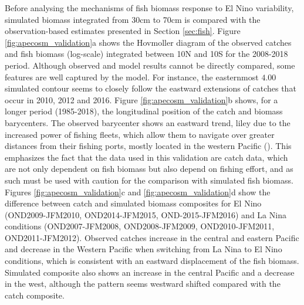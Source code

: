 Before analysing the mechanisms of fish biomass response to El Nino variability, simulated biomass integrated from 30cm to 70cm is compared with the observation-based estimates presented in Section \ref{sec:fish}. Figure \ref{fig:apecosm_validation}a shows the Hovmoller diagram of the observed catches and fish biomass (log-scale) integrated between 10N and 10S for the 2008-2018 period. Although observed and model results cannot be directly compared, some features are well captured by the model. For instance, the easternmost $4.00$ simulated contour seems to closely follow the eastward extensions of catches that occur in 2010, 2012 and 2016. Figure \ref{fig:apecosm_validation}b shows, for a longer period (1985-2018), the longitudinal position of the catch and biomass barycenters. The observed barycenter shows an eastward trend, liley due to the increased power of fishing fleets, which allow them to navigate over greater distances from their fishing ports, mostly located in the western Pacific (). This emphasizes the fact that the data used in this validation are catch data, which are not only dependent on fish biomass but also depend on fishing effort, and as such must be used with caution for the comparison with simulated fish biomass. Figures \ref{fig:apecosm_validation}c and \ref{fig:apecosm_validation}d show the difference between catch and simulated biomass composites for El Nino (OND2009-JFM2010, OND2014-JFM2015, OND-2015-JFM2016) and La Nina conditions (OND2007-JFM2008, OND2008-JFM2009, OND2010-JFM2011, OND2011-JFM2012). Observed catches increase in the central and eastern Pacific and decrease in the Western Pacific when switching from La Nina to El Nino conditions, which is consistent with an eastward displacement of the fish biomass. Simulated composite also shows an increase in the central Pacific and a decrease in the west, although the pattern seems westward shifted compared with the catch composite. 

